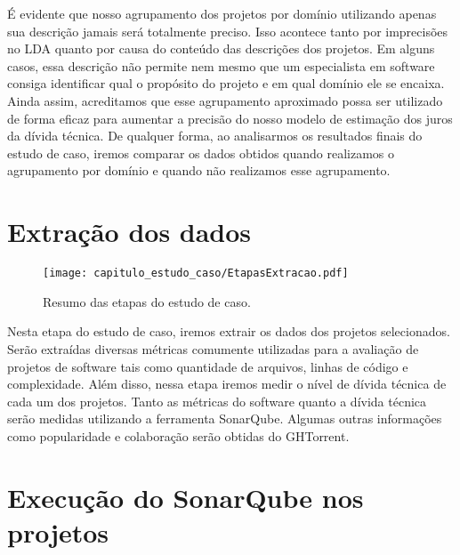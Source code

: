  
 É evidente que nosso agrupamento dos projetos por domínio utilizando apenas sua descrição jamais será totalmente preciso. Isso acontece tanto por imprecisões no LDA quanto por causa do conteúdo das descrições dos projetos. Em alguns casos, essa descrição não permite nem mesmo que um especialista em software consiga identificar qual o propósito do projeto e em qual domínio ele se encaixa. Ainda assim, acreditamos que esse agrupamento aproximado possa ser utilizado de forma eficaz para aumentar a precisão do nosso modelo de estimação dos juros da dívida técnica. De qualquer forma, ao analisarmos os resultados finais do estudo de caso, iremos comparar os dados obtidos quando realizamos o agrupamento por domínio e quando não realizamos esse agrupamento. 



\section{Extração dos dados}

  \begin{figure}[H]
  \centering
  \texttt{[image: capitulo\_estudo\_caso/EtapasExtracao.pdf]} 
  \caption{Resumo das etapas do estudo de caso. }
  \label{fig:cap_metodo_resumo_etapas_extracao} 
\end{figure}


Nesta etapa do estudo de caso, iremos extrair os dados dos projetos selecionados. Serão extraídas diversas métricas comumente utilizadas para a avaliação de projetos de software tais como quantidade de arquivos, linhas de código e complexidade. Além disso, nessa etapa iremos medir o nível de dívida técnica de cada um dos projetos.  Tanto as métricas do software quanto a dívida técnica serão medidas utilizando a ferramenta SonarQube\cite{campbell2013sonarqube}. Algumas outras informações como popularidade e colaboração serão obtidas do GHTorrent. 

\section{Execução do SonarQube nos projetos}
 
